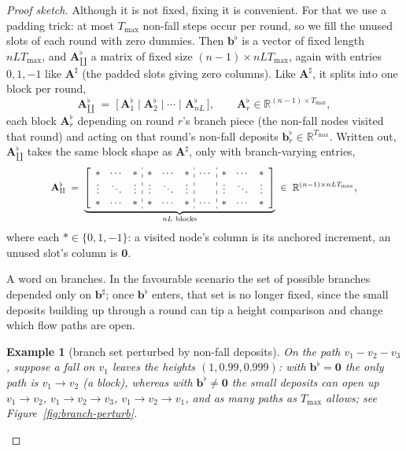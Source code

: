 \documentclass[11pt]{article}
\newtheorem{ex}{Example}
\theoremstyle{definition}
\begin{document}
\begin{proof}[Proof sketch]
Although it is not fixed, fixing it is convenient. For that we use a padding trick: at most $T_{\max}$ non-fall steps occur per round, so we fill the unused slots of each round with zero dummies. Then $\mathbf{b}^{\flat}$ is a vector of fixed length $nLT_{\max}$, and $\mathbf{A}^{\flat}_{\amalg}$ a matrix of fixed size $(n-1)\times nLT_{\max}$, again with entries $0,1,-1$ like $\mathbf{A}^{\sharp}$ (the padded slots giving zero columns). Like $\mathbf{A}^{\sharp}$, it splits into one block per round,
\[
  \mathbf{A}^{\flat}_{\amalg} \;=\; \bigl[\, \mathbf{A}^{\flat}_1 \mid \mathbf{A}^{\flat}_2 \mid \cdots \mid \mathbf{A}^{\flat}_{nL} \,\bigr], \qquad \mathbf{A}^{\flat}_r \in \mathbb{R}^{(n-1)\times T_{\max}},
\]
each block $\mathbf{A}^{\flat}_r$ depending on round $r$'s branch piece (the non-fall nodes visited that round) and acting on that round's non-fall deposits $\mathbf{b}^{\flat}_r\in\mathbb{R}^{T_{\max}}$. Written out, $\mathbf{A}^{\flat}_{\amalg}$ takes the same block shape as $\mathbf{A}^{\sharp}$, only with branch-varying entries,
\[
  \resizebox{0.8\textwidth}{!}{$\displaystyle
  \mathbf{A}^{\flat}_{\amalg} \;=\; \underbrace{\left[\begin{array}{ccc:ccc:c:ccc}
    \ast & \cdots & \ast & \ast & \cdots & \ast & \cdots & \ast & \cdots & \ast \\
    \vdots & \ddots & \vdots & \vdots & \ddots & \vdots & & \vdots & \ddots & \vdots \\
    \ast & \cdots & \ast & \ast & \cdots & \ast & \cdots & \ast & \cdots & \ast
  \end{array}\right]}_{nL\ \text{blocks}} \;\in\; \mathbb{R}^{(n-1)\times nLT_{\max}}
  $},
\]
where each $\ast\in\{0,1,-1\}$: a visited node's column is its anchored increment, an unused slot's column is $\mathbf{0}$.

\smallskip\noindent A word on branches. In the favourable scenario the set of possible branches depended only on $\mathbf{b}^{\sharp}$; once $\mathbf{b}^{\flat}$ enters, that set is no longer fixed, since the small deposits building up through a round can tip a height comparison and change which flow paths are open.

\begin{ex}[branch set perturbed by non-fall deposits]\label{ex:branch-perturb}
On the path $v_1\!-\!v_2\!-\!v_3$, suppose a fall on $v_1$ leaves the heights $(1, 0.99, 0.999)$: with $\mathbf{b}^{\flat}=\mathbf{0}$ the only path is $v_1\to v_2$ (a block), whereas with $\mathbf{b}^{\flat}\neq\mathbf{0}$ the small deposits can open up $v_1\to v_2$, $v_1\to v_2\to v_3$, $v_1\to v_2\to v_1$, and as many paths as $T_{\max}$ allows; see Figure~\ref{fig:branch-perturb}.
\end{ex}


\end{proof}
\end{document}
